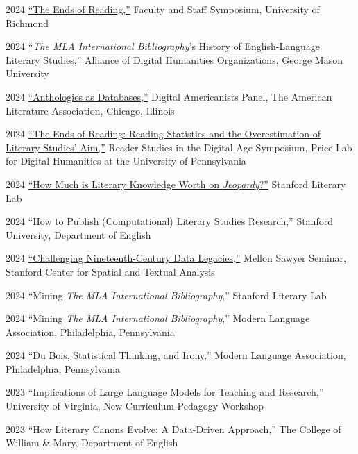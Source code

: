 \documentclass[12pt,letterpaper]{report}
\begin{document}
\begin{tablist}
	\item[2024] \tab{}\href{https://fredner.org/reading}{\enquote{The Ends of Reading,}} Faculty and Staff Symposium, University of Richmond
	\item[2024] \tab{}\href{https://docs.google.com/presentation/d/1l9RF4TAfG1vhc70sQD6SnQdnvPGKdysiGc0saopwz_U/edit?usp=sharing}{\enquote{\emph{The MLA International Bibliography}'s History of English-Language Literary Studies,}} Alliance of Digital Humanities Organizations, George Mason University
	\item[2024] \tab{}\href{https://docs.google.com/presentation/d/1kxUCWK4iz4En_G63ZDqExkxh6nzd3Qp0PB6DmuwebyU/edit?usp=sharing}{\enquote{Anthologies as Databases,}} Digital Americanists Panel, The American Literature Association, Chicago, Illinois
	\item[2024] \tab{}\href{https://fredner.org/price/}{\enquote{The Ends of Reading: Reading Statistics and the Overestimation of Literary Studies' Aim,}} Reader Studies in the Digital Age Symposium, Price Lab for Digital Humanities at the University of Pennsylvania
	\item[2024] \tab{}\href{https://docs.google.com/presentation/d/1EKy3ISqJIJrCxeOp9XZF2KULLyvgqQUtn-MRDFojC54/edit?usp=sharing}{\enquote{How Much is Literary Knowledge Worth on \emph{Jeopardy}?}} Stanford Literary Lab
	\item[2024] \tab{}\enquote{How to Publish (Computational) Literary Studies Research,} Stanford University, Department of English
	\item[2024] \tab{}\href{https://fredner.org/sawyer/}{\enquote{Challenging Nineteenth-Century Data Legacies,}} Mellon Sawyer Seminar, Stanford Center for Spatial and Textual Analysis
	\item[2024] \tab{}\enquote{Mining \emph{The MLA International Bibliography},} Stanford Literary Lab
	\item[2024] \tab{}\enquote{Mining \emph{The MLA International Bibliography},} Modern Language Association, Philadelphia, Pennsylvania
	\item[2024] \tab{}\href{https://fredner.org/files/mla24.html}{\enquote{Du Bois, Statistical Thinking, and Irony,}} Modern Language Association, Philadelphia, Pennsylvania
	\item[2023] \tab{}\enquote{Implications of Large Language Models for Teaching and Research,} University of Virginia, New Curriculum Pedagogy Workshop
	\item[2023] \tab{}\enquote{How Literary Canons Evolve: A Data-Driven Approach,} The College of William \& Mary, Department of English

\end{tablist}
\end{document}
